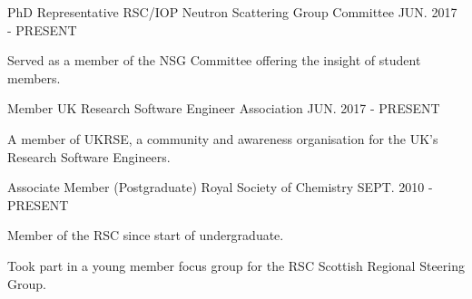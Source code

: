 \begin{cventries}
  \cventry 
  	{PhD Representative}
    {RSC/IOP Neutron Scattering Group Committee}
    {}
    {JUN. 2017 - PRESENT}
    {
      \begin{cvitems}
      	\item {Served as a member of the NSG Committee offering the insight of student members.}
	  \end{cvitems}
	}
  \cventry
    {Member}
    {UK Research Software Engineer Association}
    {}
    {JUN. 2017 - PRESENT}
    {
	  \begin{cvitems}
	  	\item{A member of UKRSE, a community and awareness organisation for the UK's Research Software Engineers.}
	  \end{cvitems}	
    }
  \cventry
    {Associate Member (Postgraduate)}
    {Royal Society of Chemistry}
    {}
    {SEPT. 2010 - PRESENT}
    {
      \begin{cvitems}
      	\item {Member of the RSC since start of undergraduate.}
        \item {Took part in a young member focus group for the RSC Scottish Regional Steering Group.}
      \end{cvitems}
    }
\end{cventries}


